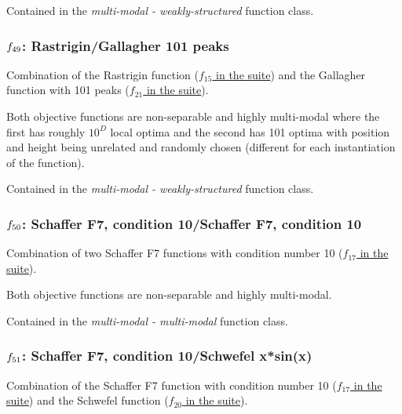 \documentclass[letterpaper,12pt,english]{article}
\begin{document}
Contained in the \emph{multi-modal - weakly-structured} function class.


\subsubsection{\protect\(f_{49}\protect\): Rastrigin/Gallagher 101 peaks}
\label{index:f49}\label{index:rastrigin-gallagher-101-peaks}
Combination of the Rastrigin function
(\href{http://coco.lri.fr/downloads/download15.03/bbobdocfunctions.pdf\#page=75}{\(f_{15}\) in the  suite}) and the Gallagher function with
101 peaks (\href{http://coco.lri.fr/downloads/download15.03/bbobdocfunctions.pdf\#page=105}{\(f_{21}\) in the  suite}).

Both objective functions are non-separable and highly multi-modal where
the first has roughly \(10^D\) local optima and the second has
101 optima with position and height being unrelated and randomly
chosen (different for each instantiation of the function).

Contained in the \emph{multi-modal - weakly-structured} function class.


\subsubsection{\protect\(f_{50}\protect\): Schaffer F7, condition 10/Schaffer F7, condition 10}
\label{index:schaffer-f7-condition-10-schaffer-f7-condition-10}\label{index:f50}
Combination of two Schaffer F7 functions with
condition number 10 (\href{http://coco.lri.fr/downloads/download15.03/bbobdocfunctions.pdf\#page=85}{\(f_{17}\) in the  suite}).

Both objective functions are non-separable and highly multi-modal.

Contained in the \emph{multi-modal - multi-modal} function class.


\subsubsection{\protect\(f_{51}\protect\): Schaffer F7, condition 10/Schwefel x*sin(x)}
\label{index:schaffer-f7-condition-10-schwefel-x-sin-x}\label{index:f51}
Combination of the Schaffer F7 function with
condition number 10 (\href{http://coco.lri.fr/downloads/download15.03/bbobdocfunctions.pdf\#page=85}{\(f_{17}\) in the  suite})
and the Schwefel function (\href{http://coco.lri.fr/downloads/download15.03/bbobdocfunctions.pdf\#page=100}{\(f_{20}\) in the  suite}).
\end{document}
